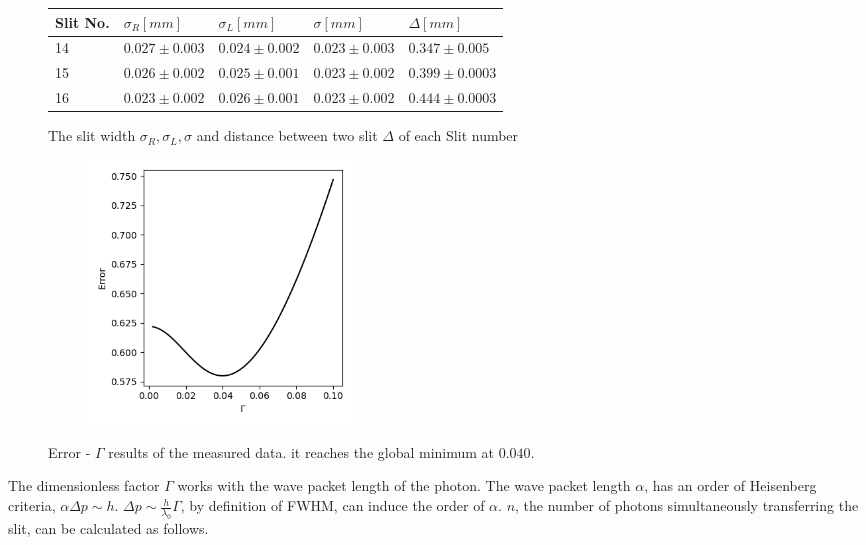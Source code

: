 \documentclass{article}
\begin{document}
\begin{figure}[H]
  \centering
  \begin{tabular}{  m{2cm}|m{2.5cm}|m{2.5cm}|m{2.5cm}|m{2.5cm}} 
    Slit No. & $\sigma_R [mm]$ &$\sigma_L [mm]$ &$\sigma [mm]$ & $\Delta [mm]$ \\ \hline \hline
    14 &   $0.027 \pm 0.003 $& $ 0.024 \pm 0.002 $ & $0.023  \pm 0.003 $  & $0.347  \pm 0.005 $ \\ \hline
    15 &  $0.026 \pm 0.002 $ & $0.025 \pm 0.001 $ & $0.023  \pm 0.002 $ & $0.399  \pm 0.0003 $\\ \hline
    16 &  $0.023 \pm 0.002 $ & $0.026 \pm 0.001 $ & $0.023   \pm 0.002 $ & $0.444  \pm 0.0003 $ \\ 
    
  \end{tabular}
  \caption{The slit width $\sigma_R, \sigma_L, \sigma$ and distance between two slit $\Delta$ of each Slit number}
  \label{fig: bulb_slit_spec}
\end{figure}


\begin{figure}[H]
  \centering
  \begin{subfigure}[b]{7cm}
      \centering
      \includegraphics[width=7cm]{../results/bulb_wavelength_dispersion.png}
      \caption{}
  \end{subfigure}
  \hfill
  \caption{Error - $\Gamma$ results of the measured data. it reaches the global minimum at $0.040$.}
  \label{fig: bulb_dispersion}
\end{figure}

The dimensionless factor $\Gamma$ works with the wave packet length of the photon.
The wave packet length $\alpha$, has an order of Heisenberg criteria, $\alpha \Delta p \sim h$.
$\Delta p \sim \frac{h}{\lambda_0} \Gamma$, by definition of FWHM, can induce the order of $\alpha$.
$n$, the number of photons simultaneously transferring the slit, can be calculated as follows.
\end{document}
